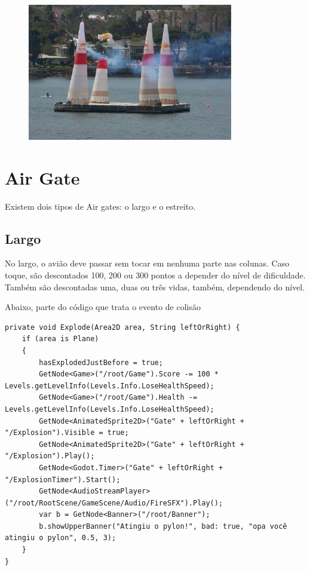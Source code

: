 \begin{figure}[h]
    \centering
    \includegraphics[width=0.8\textwidth]{red-bull-2.jpg}
\end{figure}

\section*{Air Gate}
Existem dois tipos de Air gates: o largo e o estreito.

\subsection*{Largo}
No largo, o avião deve passar sem tocar em nenhuma parte nas colunas. Caso toque, são descontados 100, 200 ou 300 pontos a depender do nível de dificuldade. 
Também são descontadas uma, duas ou três vidas, também, dependendo do nível.

Abaixo, parte do código que trata o evento de colisão
\begin{lstlisting}
private void Explode(Area2D area, String leftOrRight) {
    if (area is Plane)
    {
        hasExplodedJustBefore = true;
        GetNode<Game>("/root/Game").Score -= 100 * Levels.getLevelInfo(Levels.Info.LoseHealthSpeed);
        GetNode<Game>("/root/Game").Health -= Levels.getLevelInfo(Levels.Info.LoseHealthSpeed);
        GetNode<AnimatedSprite2D>("Gate" + leftOrRight + "/Explosion").Visible = true;
        GetNode<AnimatedSprite2D>("Gate" + leftOrRight + "/Explosion").Play();
        GetNode<Godot.Timer>("Gate" + leftOrRight + "/ExplosionTimer").Start();
        GetNode<AudioStreamPlayer>("/root/RootScene/GameScene/Audio/FireSFX").Play();
        var b = GetNode<Banner>("/root/Banner");
        b.showUpperBanner("Atingiu o pylon!", bad: true, "opa você atingiu o pylon", 0.5, 3);
    }
}
\end{lstlisting}

